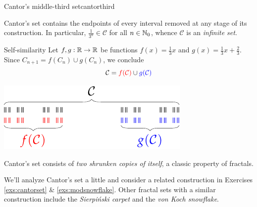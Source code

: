 \begin{example}{Cantor's middle-third set}{cantorthird}
\begin{description}
		\item[Infinite Cardinality] Cantor's set contains the endpoints of every interval removed at any stage of its construction. In particular, $\frac 1{3^n}\in\mathcal C$ for all $n\in\mathbb{N}_0$, whence $\mathcal C$ is an \emph{infinite set}.\footnotemark
	
		\begin{minipage}[t]{0.6\linewidth}\vspace{-2pt}
		\item[Self-similarity] Let $f,g:\mathbb{R}\to\mathbb{R}$ be functions $f(x)=\frac 13 x$ and $g(x)=\frac 13x+\frac 23$. Since $C_{n+1}=f(C_n)\cup g(C_n)$, we conclude
		\[
			\mathcal C=\textcolor{red}{f(\mathcal C)}\cup \textcolor{blue}{g(\mathcal C)}
		\]
		\end{minipage}
		\hfill
		\begin{minipage}[t]{0.39\linewidth}\vspace{-4pt}
			\hfill\includegraphics{setsii-09-cantorselfsim}
		\end{minipage}
		\smallbreak
		
		Cantor's set consists of \emph{two shrunken copies of itself}, a classic property of fractals.
	\end{description}

\end{example}


We'll analyze Cantor's set a little and consider a related construction in Exercises \ref{exs:cantorset} \& \ref{exs:modsnowflake}. Other fractal sets with a similar construction include the \emph{Sierpiński carpet} and the \emph{von Koch snowflake}.



